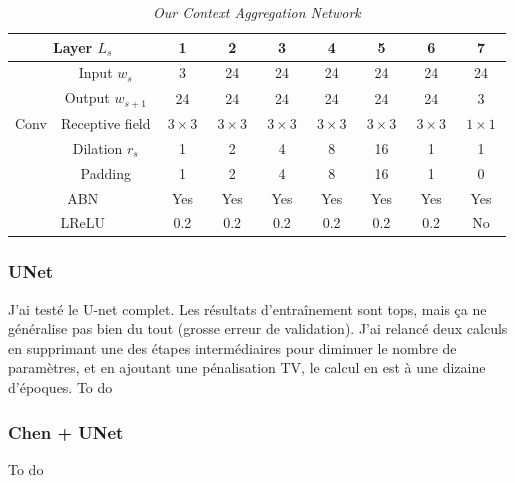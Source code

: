 \documentclass{article}
\begin{document}
            \begin{table}[!ht]
                \centering
                \begin{tabular}{|c|c||c|cccc|cc|}
                    \hline
                    \multicolumn{2}{|c||}{Layer $L_s$} & 1 & 2 & 3 & 4 & 5 & 6 & 7 \\
                    \hline
                    \hline
                     & Input $w_s$ & 3 & 24 & 24 & 24 & 24 & 24 & 24 \\
                     & Output $w_{s+1}$ & 24 & 24 & 24 & 24 & 24 & 24 & 3 \\
                    \cline{2-9}
                    Conv & Receptive field & $\ 3\times 3\ $ & $\ 3\times 3\ $ & $\ 3\times 3\ $ & $\ 3\times 3\ $ & $\ 3\times 3\ $ & $\ 3\times 3\ $ & $\ 1\times 1\ $ \\
                     & Dilation $r_s$ & 1 & 2 & 4 & 8 & 16 & 1 & 1 \\
                     & Padding & 1 & 2 & 4 & 8 & 16 & 1 & 0 \\
                    \hline
                    \multicolumn{2}{|c||}{ABN} & Yes & Yes & Yes & Yes & Yes & Yes & Yes \\
                    \hline
                    \multicolumn{2}{|c||}{LReLU} & 0.2 & 0.2 & 0.2 & 0.2 & 0.2 & 0.2 & No \\
                    \hline
                \end{tabular}
                \caption{\textit{Our Context Aggregation Network}}
            \end{table}

        \subsubsection{UNet}
            J'ai testé le U-net complet. Les résultats d'entraînement sont tops, mais ça ne généralise pas bien du tout (grosse erreur de validation). J'ai relancé deux calculs en supprimant une des étapes intermédiaires pour diminuer le nombre de paramètres, et en ajoutant une pénalisation TV, le calcul en est à une dizaine d'époques.
            To do
        \subsubsection{Chen + UNet}
            To do
\end{document}
